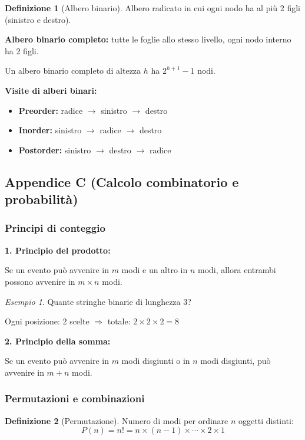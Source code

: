 \documentclass[a4paper, 11pt]{article}
\theoremstyle{definition}
\newtheorem{definizione}{Definizione}[section]
\theoremstyle{remark}
\newtheorem{esempio}{Esempio}[section]
\theoremstyle{remark}
\begin{document}
	\begin{definizione}[Albero binario]
		Albero radicato in cui ogni nodo ha al più 2 figli (sinistro e destro).
		
		\textbf{Albero binario completo:} tutte le foglie allo stesso livello, ogni nodo interno ha 2 figli.
		
		Un albero binario completo di altezza $h$ ha $2^{h+1} - 1$ nodi.
	\end{definizione}
	
	\textbf{Visite di alberi binari:}
	\begin{itemize}
		\item \textbf{Preorder:} radice $\to$ sinistro $\to$ destro
		\item \textbf{Inorder:} sinistro $\to$ radice $\to$ destro
		\item \textbf{Postorder:} sinistro $\to$ destro $\to$ radice
	\end{itemize}
	
	\subsection{Appendice C (Calcolo combinatorio e probabilità)}
	
	\subsubsection{Principi di conteggio}
	
	\textbf{1. Principio del prodotto:}
	
	Se un evento può avvenire in $m$ modi e un altro in $n$ modi, allora entrambi possono avvenire in $m \times n$ modi.
	
	\begin{esempio}
		Quante stringhe binarie di lunghezza 3?
		
		Ogni posizione: 2 scelte $\Rightarrow$ totale: $2 \times 2 \times 2 = 8$
	\end{esempio}
	
	\textbf{2. Principio della somma:}
	
	Se un evento può avvenire in $m$ modi disgiunti o in $n$ modi disgiunti, può avvenire in $m + n$ modi.
	
	\subsubsection{Permutazioni e combinazioni}
	
	\begin{definizione}[Permutazione]
		Numero di modi per ordinare $n$ oggetti distinti:
		\[
		P(n) = n! = n \times (n-1) \times \cdots \times 2 \times 1
		\]
	\end{definizione}
	
\end{document}
